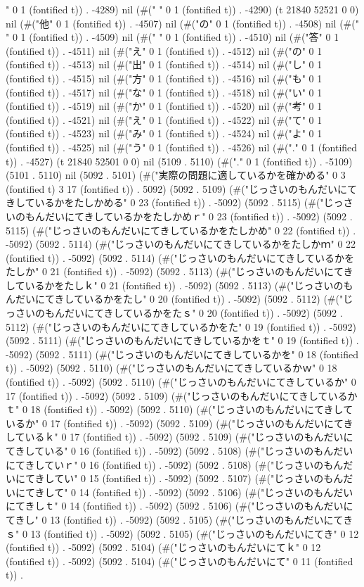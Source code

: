 " 0 1 (fontified t)) . -4289) nil (#("	" 0 1 (fontified t)) . -4290) (t 21840 52521 0 0) nil (#("他" 0 1 (fontified t)) . -4507) nil (#("の" 0 1 (fontified t)) . -4508) nil (#("
" 0 1 (fontified t)) . -4509) nil (#("	" 0 1 (fontified t)) . -4510) nil (#("答" 0 1 (fontified t)) . -4511) nil (#("え" 0 1 (fontified t)) . -4512) nil (#("の" 0 1 (fontified t)) . -4513) nil (#("出" 0 1 (fontified t)) . -4514) nil (#("し" 0 1 (fontified t)) . -4515) nil (#("方" 0 1 (fontified t)) . -4516) nil (#("も" 0 1 (fontified t)) . -4517) nil (#("な" 0 1 (fontified t)) . -4518) nil (#("い" 0 1 (fontified t)) . -4519) nil (#("か" 0 1 (fontified t)) . -4520) nil (#("考" 0 1 (fontified t)) . -4521) nil (#("え" 0 1 (fontified t)) . -4522) nil (#("て" 0 1 (fontified t)) . -4523) nil (#("み" 0 1 (fontified t)) . -4524) nil (#("よ" 0 1 (fontified t)) . -4525) nil (#("う" 0 1 (fontified t)) . -4526) nil (#("." 0 1 (fontified t)) . -4527) (t 21840 52501 0 0) nil (5109 . 5110) (#("." 0 1 (fontified t)) . -5109) (5101 . 5110) nil (5092 . 5101) (#("実際の問題に適しているかを確かめる" 0 3 (fontified t) 3 17 (fontified t)) . 5092) (5092 . 5109) (#("じっさいのもんだいにてきしているかをたしかめる" 0 23 (fontified t)) . -5092) (5092 . 5115) (#("じっさいのもんだいにてきしているかをたしかめｒ" 0 23 (fontified t)) . -5092) (5092 . 5115) (#("じっさいのもんだいにてきしているかをたしかめ" 0 22 (fontified t)) . -5092) (5092 . 5114) (#("じっさいのもんだいにてきしているかをたしかｍ" 0 22 (fontified t)) . -5092) (5092 . 5114) (#("じっさいのもんだいにてきしているかをたしか" 0 21 (fontified t)) . -5092) (5092 . 5113) (#("じっさいのもんだいにてきしているかをたしｋ" 0 21 (fontified t)) . -5092) (5092 . 5113) (#("じっさいのもんだいにてきしているかをたし" 0 20 (fontified t)) . -5092) (5092 . 5112) (#("じっさいのもんだいにてきしているかをたｓ" 0 20 (fontified t)) . -5092) (5092 . 5112) (#("じっさいのもんだいにてきしているかをた" 0 19 (fontified t)) . -5092) (5092 . 5111) (#("じっさいのもんだいにてきしているかをｔ" 0 19 (fontified t)) . -5092) (5092 . 5111) (#("じっさいのもんだいにてきしているかを" 0 18 (fontified t)) . -5092) (5092 . 5110) (#("じっさいのもんだいにてきしているかｗ" 0 18 (fontified t)) . -5092) (5092 . 5110) (#("じっさいのもんだいにてきしているか" 0 17 (fontified t)) . -5092) (5092 . 5109) (#("じっさいのもんだいにてきしているかｔ" 0 18 (fontified t)) . -5092) (5092 . 5110) (#("じっさいのもんだいにてきしているか" 0 17 (fontified t)) . -5092) (5092 . 5109) (#("じっさいのもんだいにてきしているｋ" 0 17 (fontified t)) . -5092) (5092 . 5109) (#("じっさいのもんだいにてきしている" 0 16 (fontified t)) . -5092) (5092 . 5108) (#("じっさいのもんだいにてきしていｒ" 0 16 (fontified t)) . -5092) (5092 . 5108) (#("じっさいのもんだいにてきしてい" 0 15 (fontified t)) . -5092) (5092 . 5107) (#("じっさいのもんだいにてきして" 0 14 (fontified t)) . -5092) (5092 . 5106) (#("じっさいのもんだいにてきしｔ" 0 14 (fontified t)) . -5092) (5092 . 5106) (#("じっさいのもんだいにてきし" 0 13 (fontified t)) . -5092) (5092 . 5105) (#("じっさいのもんだいにてきｓ" 0 13 (fontified t)) . -5092) (5092 . 5105) (#("じっさいのもんだいにてき" 0 12 (fontified t)) . -5092) (5092 . 5104) (#("じっさいのもんだいにてｋ" 0 12 (fontified t)) . -5092) (5092 . 5104) (#("じっさいのもんだいにて" 0 11 (fontified t)) . 